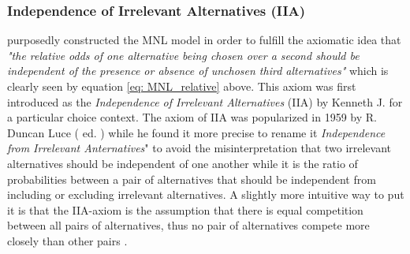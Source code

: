 %
%
%

\subsubsection{Independence of Irrelevant Alternatives (IIA)} \label{subsec: IIA}
\citet{mcfadden_conditional_1973} purposedly constructed the MNL model in order to fulfill the axiomatic idea that \textit{"the relative odds of one alternative being chosen over a second should be independent of the presence or absence of unchosen third alternatives"} which is clearly seen by equation \ref{eq: MNL_relative} above. This axiom was first introduced as the \textit{Independence of Irrelevant Alternatives} (IIA) by Kenneth J. \cite{arrow_difficulty_1950} for a particular choice context. The axiom of IIA was popularized in 1959 by R. Duncan Luce ( ed. \citeyear{luce_individual_2005}) while he found it more precise to rename it \textit{Independence from Irrelevant Anternatives}" to avoid the misinterpretation that two irrelevant alternatives should be independent of one another while it is the ratio of probabilities between a pair of alternatives that should be independent from including or excluding irrelevant alternatives. A slightly more intuitive way to put it is that the IIA-axiom is the assumption that there is equal competition between all pairs of alternatives, thus no pair of alternatives compete more closely than other pairs \citep{koppelman_self_2006}.

